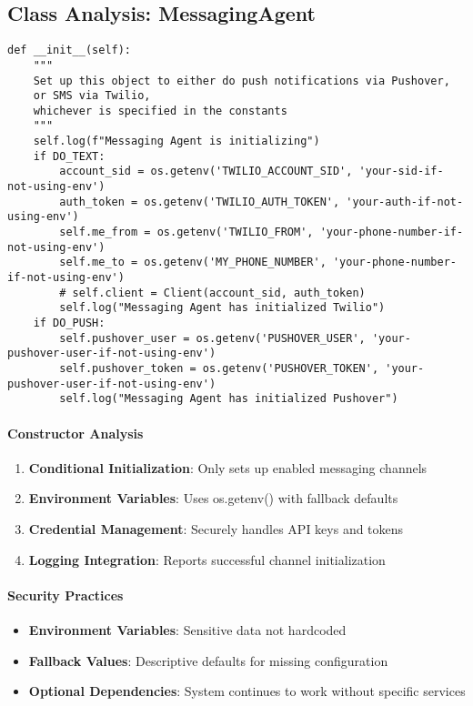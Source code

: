 \subsection{Class Analysis: MessagingAgent}

\begin{lstlisting}[caption=MessagingAgent Constructor]
def __init__(self):
    """
    Set up this object to either do push notifications via Pushover,
    or SMS via Twilio,
    whichever is specified in the constants
    """
    self.log(f"Messaging Agent is initializing")
    if DO_TEXT:
        account_sid = os.getenv('TWILIO_ACCOUNT_SID', 'your-sid-if-not-using-env')
        auth_token = os.getenv('TWILIO_AUTH_TOKEN', 'your-auth-if-not-using-env')
        self.me_from = os.getenv('TWILIO_FROM', 'your-phone-number-if-not-using-env')
        self.me_to = os.getenv('MY_PHONE_NUMBER', 'your-phone-number-if-not-using-env')
        # self.client = Client(account_sid, auth_token)
        self.log("Messaging Agent has initialized Twilio")
    if DO_PUSH:
        self.pushover_user = os.getenv('PUSHOVER_USER', 'your-pushover-user-if-not-using-env')
        self.pushover_token = os.getenv('PUSHOVER_TOKEN', 'your-pushover-user-if-not-using-env')
        self.log("Messaging Agent has initialized Pushover")
\end{lstlisting}

\paragraph{Constructor Analysis}
\begin{enumerate}
\item \textbf{Conditional Initialization}: Only sets up enabled messaging channels
\item \textbf{Environment Variables}: Uses os.getenv() with fallback defaults
\item \textbf{Credential Management}: Securely handles API keys and tokens
\item \textbf{Logging Integration}: Reports successful channel initialization
\end{enumerate}

\paragraph{Security Practices}
\begin{itemize}
\item \textbf{Environment Variables}: Sensitive data not hardcoded
\item \textbf{Fallback Values}: Descriptive defaults for missing configuration
\item \textbf{Optional Dependencies}: System continues to work without specific services
\end{itemize}

